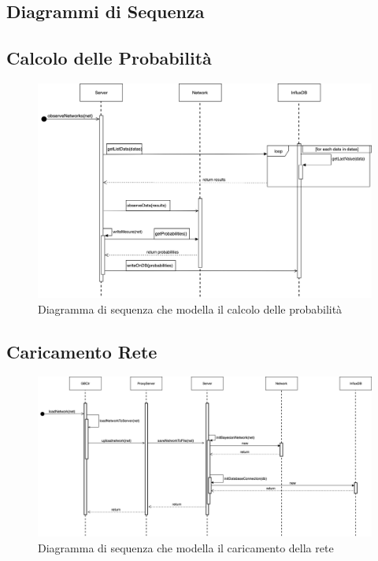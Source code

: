 \begin{landscape}
	\section{Diagrammi di Sequenza}
	\subsection{Calcolo delle Probabilità}
\begin{figure}[H]
	\begin{center}
		\includegraphics[scale=0.40]{./images/calocloProbSeq.png} 
	\end{center}
	\caption{Diagramma di sequenza che modella il calcolo delle probabilità}
\end{figure}
\end{landscape}

\begin{landscape}
	\subsection{Caricamento Rete}
	\begin{figure}[H]
		\begin{center}
			\includegraphics[scale=0.40]{./images/caricamentoReteSeq.png} 
		\end{center}
		\caption{Diagramma di sequenza che modella il caricamento della rete}
	\end{figure}
\end{landscape}
